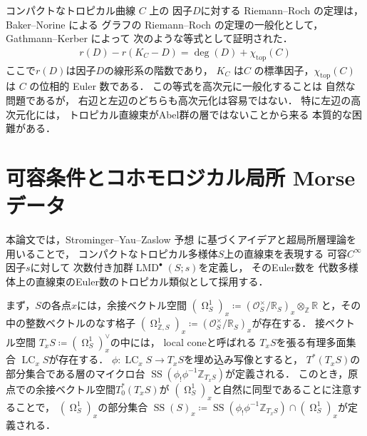 \documentclass[uplatex,dvipdfmx,12pt]{jsarticle}
\numberwithin{equation}{section}
\theoremstyle{definition}
\newcommand{\deq}{\coloneqq}
\newcommand{\opn}[1]{\operatorname{#1}}
\newcommand{\beforesection}{\vspace{-15pt}}
\newcommand{\aftersection}{\vspace{-8pt}}
\DeclareMathOperator{\tform}{\Omega}
\begin{document}
コンパクトなトロピカル曲線 $C$ 上の
因子$D$に対する
Riemann--Roch の定理は，
Baker--Norine による
グラフの Riemann--Roch の定理の一般化として，
Gathmann--Kerber
\cite{gathmannRiemannRochTheoremTropical2008a} によって 
次のような等式として証明された．
\begin{align} \label{equation-tropical-rr}
r(D)-r(K_C-D)=\opn{deg}(D)+\chi_{\mathrm{top}}(C)
\end{align}
ここで$r(D)$は因子$D$の線形系の階数であり，
$K_C$ は$C$ の標準因子，$\chi_{\mathrm{top}}(C)$ は
$C$ の位相的 Euler 数である．
この等式を高次元に一般化することは
自然な問題であるが，
右辺と左辺のどちらも高次元化は容易ではない．
特に左辺の高次元化には，
トロピカル直線束がAbel群の層ではないことから来る
本質的な困難がある．

\beforesection

\section{可容条件とコホモロジカル局所 Morse データ}

\aftersection

本論文では，Strominger--Yau--Zaslow 予想
\cite{stromingerMirrorSymmetryTduality1996}
に基づくアイデアと超局所層理論\cite{MR1299726}を
用いることで，
コンパクトなトロピカル多様体$S$上の直線束を表現する 
可容$C^{\infty}$因子$s$に対して
次数付き加群$\opn{LMD}^{\bullet}(S;s)$を定義し，
そのEuler数を
代数多様体上の直線束のEuler数のトロピカル類似として採用する．

まず，$S$の各点$x$には，余接ベクトル空間
$(\tform^{1}_{S})_x\deq
(\mathcal{O}_S^{\times}/\mathbb{R}_S)_x
\otimes_{\mathbb{Z}}\mathbb{R}$
と，その中の整数ベクトルのなす格子
$(\tform^{1}_{\mathbb{Z},S})_x\deq
(\mathcal{O}_S^{\times}/\mathbb{R}_S)_x$が存在する．
接ベクトル空間
$T_x S\deq(\tform^{1}_{S})_x^{\vee}$の中には，
local coneと呼ばれる
$T_xS$を張る有理多面集合
$\opn{LC}_x S$が存在する．
$\phi \colon \opn{LC}_x S\to T_x S$を埋め込み写像とすると，
$T^{*}(T_xS)$の部分集合である層のマイクロ台
$\opn{SS}(\phi_!\phi^{-1}\mathbb{Z}_{T_xS})$が定義される．
このとき，原点での余接ベクトル空間$T^{*}_0(T_xS)$が
$(\tform_S^{1})_x$と自然に同型であることに注意することで，
$(\tform_S^{1})_x$の部分集合
$\opn{SS}(S)_x\deq \opn{SS}(\phi_!\phi^{-1}\mathbb{Z}_{T_xS})
\cap (\tform_S^{1})_x$が定義される．
\end{document}
